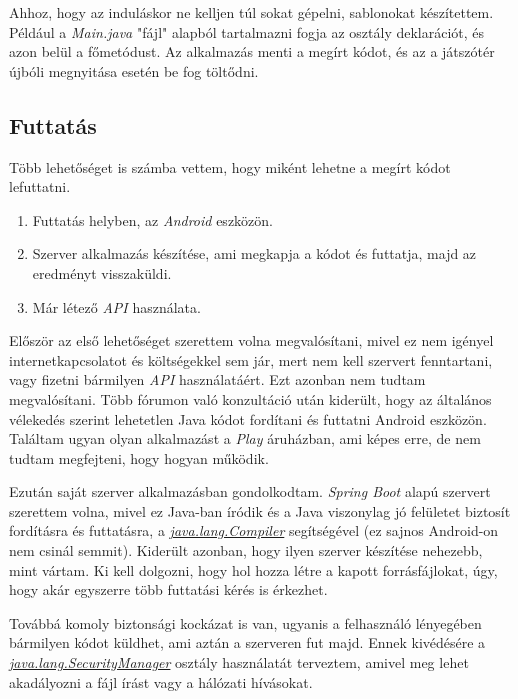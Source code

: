 \documentclass[12pt,a4paper]{article}
\begin{document}
	Ahhoz, hogy az induláskor ne kelljen túl sokat gépelni, sablonokat készítettem. Például a \textit{Main.java} "fájl" alapból tartalmazni fogja az osztály deklarációt, és azon belül a főmetódust. Az alkalmazás menti a megírt kódot, és az a játszótér újbóli megnyitása esetén be fog töltődni. 

	\subsection{Futtatás}
	
	Több lehetőséget is számba vettem, hogy miként lehetne a megírt kódot lefuttatni.
	
	\begin{enumerate}
		\item Futtatás helyben, az \textit{Android} eszközön.
		\item Szerver alkalmazás készítése, ami megkapja a kódot és futtatja, majd az eredményt visszaküldi.
		\item Már létező \textit{API} használata.
	\end{enumerate}

	Először az első lehetőséget szerettem volna megvalósítani, mivel ez nem igényel internetkapcsolatot és költségekkel sem jár, mert nem kell szervert fenntartani, vagy fizetni bármilyen \textit{API} használatáért. Ezt azonban nem tudtam megvalósítani. Több fórumon való konzultáció után kiderült, hogy az általános vélekedés szerint lehetetlen Java kódot fordítani és futtatni Android eszközön. Találtam ugyan olyan alkalmazást a \textit{Play} áruházban, ami képes erre, de nem tudtam megfejteni, hogy hogyan működik.
	
	Ezután saját szerver alkalmazásban gondolkodtam. \textit{Spring Boot} alapú szervert szerettem volna, mivel ez Java-ban íródik és a Java viszonylag jó felületet biztosít fordításra és futtatásra, a \href{https://docs.oracle.com/javase/7/docs/api/java/lang/Compiler.html}{\textit{java.lang.Compiler}} segítségével (ez sajnos Android-on nem csinál semmit). Kiderült azonban, hogy ilyen szerver készítése nehezebb, mint vártam. Ki kell dolgozni, hogy hol hozza létre a kapott forrásfájlokat, úgy, hogy akár egyszerre több futtatási kérés is érkezhet. 
	
	Továbbá komoly biztonsági kockázat is van, ugyanis a felhasználó lényegében bármilyen kódot küldhet, ami aztán a szerveren fut majd. Ennek kivédésére a \href{https://docs.oracle.com/javase/8/docs/api/java/lang/SecurityManager.html}{\textit{java.lang.SecurityManager}} osztály használatát terveztem, amivel meg lehet akadályozni a fájl írást vagy a hálózati hívásokat.
	
\end{document}
